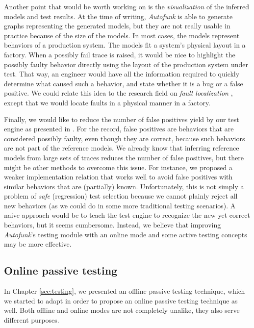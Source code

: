 Another point that would be worth working on is the
\emph{visualization} of the inferred models and test results. At
the time of writing, \emph{Autofunk} is able to generate graphs
representing the generated models, but they are not really usable
in practice because of the size of the models. In most cases, the
models represent behaviors of a production system. The models fit
a system's physical layout in a factory. When a possibly fail
trace is raised, it would be nice to highlight the possibly
faulty behavior directly using the layout of the production
system under test. That way, an engineer would have all the
information required to quickly determine what caused such a
behavior, and state whether it is a bug or a false positive. We
could relate this idea to the research field on \emph{fault
localization} \cite{jones2002visualization,wong2010software},
except that we would locate faults in a physical manner in a
factory.

Finally, we would like to reduce the number of false positives
yield by our test engine as presented in
. For the
record, false positives are behaviors that are considered
possibly faulty, even though they are correct, because such
behaviors are not part of the reference models. We already know
that inferring reference models from large sets of traces reduces
the number of false positives, but there might be other methods
to overcome this issue. For instance, we proposed a weaker
implementation relation that works well to avoid false positives
with similar behaviors that are (partially) known. Unfortunately,
this is not simply a problem of \emph{safe} (regression) test
selection \cite{orso2004scaling} because we cannot plainly reject
all new behaviors (as we could do in some more traditional
testing scenarios). A naive approach would be to teach the test
engine to recognize the new yet correct behaviors, but it seems
cumbersome. Instead, we believe that improving \emph{Autofunk}'s
testing module with an online mode and some active testing
concepts may be more effective.


\subsection{Online passive testing}
\label{sec:conclusion:testing:online}

In Chapter \ref{sec:testing}, we presented an offline passive
testing technique, which we started to adapt in order to propose
an online passive testing technique as well. Both offline and
online modes are not completely unalike, they also serve
different purposes.

